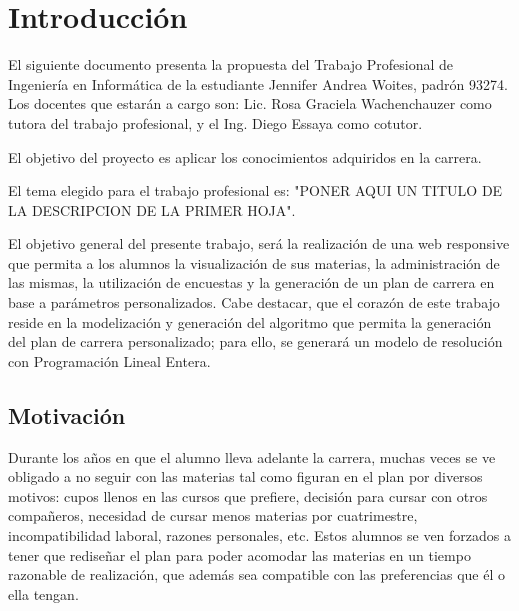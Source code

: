 \documentclass[a4paper]{article}
\begin{document}
  \newpage
  

  \tableofcontents %
    
  \pagestyle{fancy} %
  \rhead{}
  \renewcommand{\headrulewidth}{0.4pt} %

  \newpage


\section{Introducción}

El siguiente documento presenta la propuesta del Trabajo Profesional de Ingeniería en Informática de la estudiante Jennifer Andrea Woites, padrón 93274. Los docentes que estarán a cargo son: Lic. Rosa Graciela Wachenchauzer como tutora del trabajo profesional, y el Ing. Diego Essaya como cotutor. \newline

El objetivo del proyecto es aplicar los conocimientos adquiridos en la carrera. \newline

El tema elegido para el trabajo profesional es: "PONER AQUI UN TITULO DE LA DESCRIPCION DE LA PRIMER HOJA". \newline

El objetivo general del presente trabajo, será la realización de una web responsive que permita a los alumnos la visualización de sus materias, la administración de las mismas, la utilización de encuestas y la generación de un plan de carrera en base a parámetros personalizados. Cabe destacar, que el corazón de este trabajo reside en la modelización y generación del algoritmo que permita la generación del plan de carrera personalizado; para ello, se generará un modelo de resolución con Programación Lineal Entera.

\subsection{Motivación}

Durante los años en que el alumno lleva adelante la carrera, muchas veces se ve obligado a no seguir con las materias tal como figuran en el plan por diversos motivos: cupos llenos en las cursos que prefiere, decisión para cursar con otros compañeros, necesidad de cursar menos materias por cuatrimestre, incompatibilidad laboral, razones personales, etc. Estos alumnos se ven forzados a tener que rediseñar el plan para poder acomodar las materias en un tiempo razonable de realización, que además sea compatible con las preferencias que él o ella tengan.
\end{document}
